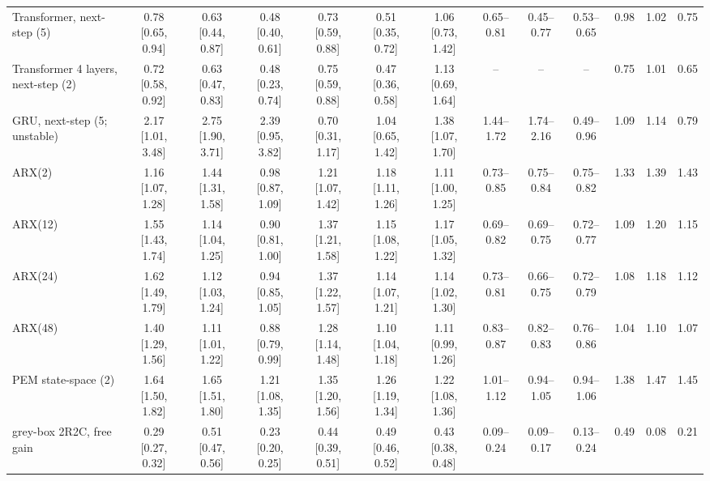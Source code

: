 \documentclass[11pt]{article}
\begin{document}
\begin{table}[t]
{\begin{tabular}{lccc|ccc|ccc|ccc}
Transformer, next-step (5) & 0.78 [0.65, 0.94] & 0.63 [0.44, 0.87] & 0.48 [0.40, 0.61] & 0.73 [0.59, 0.88] & 0.51 [0.35, 0.72] & 1.06 [0.73, 1.42] & 0.65--0.81 & 0.45--0.77 & 0.53--0.65 & 0.98 & 1.02 & 0.75\\
Transformer 4 layers, next-step (2) & 0.72 [0.58, 0.92] & 0.63 [0.47, 0.83] & 0.48 [0.23, 0.74] & 0.75 [0.59, 0.88] & 0.47 [0.36, 0.58] & 1.13 [0.69, 1.64] & -- & -- & -- & 0.75 & 1.01 & 0.65\\
GRU, next-step (5; unstable) & 2.17 [1.01, 3.48] & 2.75 [1.90, 3.71] & 2.39 [0.95, 3.82] & 0.70 [0.31, 1.17] & 1.04 [0.65, 1.42] & 1.38 [1.07, 1.70] & 1.44--1.72 & 1.74--2.16 & 0.49--0.96 & 1.09 & 1.14 & 0.79\\
ARX(2) & 1.16 [1.07, 1.28] & 1.44 [1.31, 1.58] & 0.98 [0.87, 1.09] & 1.21 [1.07, 1.42] & 1.18 [1.11, 1.26] & 1.11 [1.00, 1.25] & 0.73--0.85 & 0.75--0.84 & 0.75--0.82 & 1.33 & 1.39 & 1.43\\
ARX(12) & 1.55 [1.43, 1.74] & 1.14 [1.04, 1.25] & 0.90 [0.81, 1.00] & 1.37 [1.21, 1.58] & 1.15 [1.08, 1.22] & 1.17 [1.05, 1.32] & 0.69--0.82 & 0.69--0.75 & 0.72--0.77 & 1.09 & 1.20 & 1.15\\
ARX(24) & 1.62 [1.49, 1.79] & 1.12 [1.03, 1.24] & 0.94 [0.85, 1.05] & 1.37 [1.22, 1.57] & 1.14 [1.07, 1.21] & 1.14 [1.02, 1.30] & 0.73--0.81 & 0.66--0.75 & 0.72--0.79 & 1.08 & 1.18 & 1.12\\
ARX(48) & 1.40 [1.29, 1.56] & 1.11 [1.01, 1.22] & 0.88 [0.79, 0.99] & 1.28 [1.14, 1.48] & 1.10 [1.04, 1.18] & 1.11 [0.99, 1.26] & 0.83--0.87 & 0.82--0.83 & 0.76--0.86 & 1.04 & 1.10 & 1.07\\
PEM state-space (2) & 1.64 [1.50, 1.82] & 1.65 [1.51, 1.80] & 1.21 [1.08, 1.35] & 1.35 [1.20, 1.56] & 1.26 [1.19, 1.34] & 1.22 [1.08, 1.36] & 1.01--1.12 & 0.94--1.05 & 0.94--1.06 & 1.38 & 1.47 & 1.45\\
grey-box 2R2C, free gain & 0.29 [0.27, 0.32] & 0.51 [0.47, 0.56] & 0.23 [0.20, 0.25] & 0.44 [0.39, 0.51] & 0.49 [0.46, 0.52] & 0.43 [0.38, 0.48] & 0.09--0.24 & 0.09--0.17 & 0.13--0.24 & 0.49 & 0.08 & 0.21\\
\bottomrule\end{tabular}}\end{table}
\end{document}
